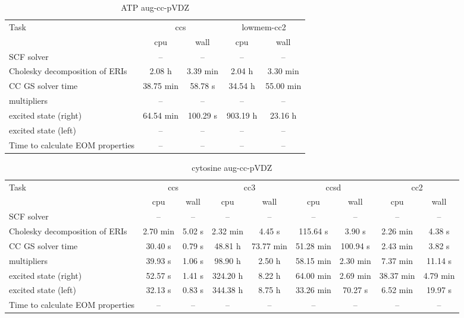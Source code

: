 \documentclass{article}
\begin{document}
\begin{table}
\caption{ATP aug-cc-pVDZ}
\begin{tabular}{lcccc}
\toprule
Task & \multicolumn{2}{c}{ccs} & \multicolumn{2}{c}{lowmem-cc2}\\
\cmidrule(lr){2-3}\cmidrule(lr){4-5}
 & cpu & wall & cpu & wall\\
\midrule
SCF solver & -- & -- & -- & --\\
Cholesky decomposition of ERIs & 2.08 h & 3.39 min & 2.04 h & 3.30 min\\
CC GS solver time & 38.75 min & 58.78 s & 34.54 h & 55.00 min\\
multipliers & -- & -- & -- & --\\
excited state (right) & 64.54 min & 100.29 s & 903.19 h & 23.16 h\\
excited state (left) & -- & -- & -- & --\\
Time to calculate EOM properties & -- & -- & -- & --\\
\bottomrule
\end{tabular}
\end{table}
\begin{table}
\caption{cytosine aug-cc-pVDZ}
\begin{tabular}{lcccccccc}
\toprule
Task & \multicolumn{2}{c}{ccs} & \multicolumn{2}{c}{cc3} & \multicolumn{2}{c}{ccsd} & \multicolumn{2}{c}{cc2}\\
\cmidrule(lr){2-3}\cmidrule(lr){4-5}\cmidrule(lr){6-7}\cmidrule(lr){8-9}
 & cpu & wall & cpu & wall & cpu & wall & cpu & wall\\
\midrule
SCF solver & -- & -- & -- & -- & -- & -- & -- & --\\
Cholesky decomposition of ERIs & 2.70 min & 5.02 s & 2.32 min & 4.45 s & 115.64 s & 3.90 s & 2.26 min & 4.38 s\\
CC GS solver time & 30.40 s & 0.79 s & 48.81 h & 73.77 min & 51.28 min & 100.94 s & 2.43 min & 3.82 s\\
multipliers & 39.93 s & 1.06 s & 98.90 h & 2.50 h & 58.15 min & 2.30 min & 7.37 min & 11.14 s\\
excited state (right) & 52.57 s & 1.41 s & 324.20 h & 8.22 h & 64.00 min & 2.69 min & 38.37 min & 4.79 min\\
excited state (left) & 32.13 s & 0.83 s & 344.38 h & 8.75 h & 33.26 min & 70.27 s & 6.52 min & 19.97 s\\
Time to calculate EOM properties & -- & -- & -- & -- & -- & -- & -- & --\\
\bottomrule
\end{tabular}
\end{table}
\end{document}
